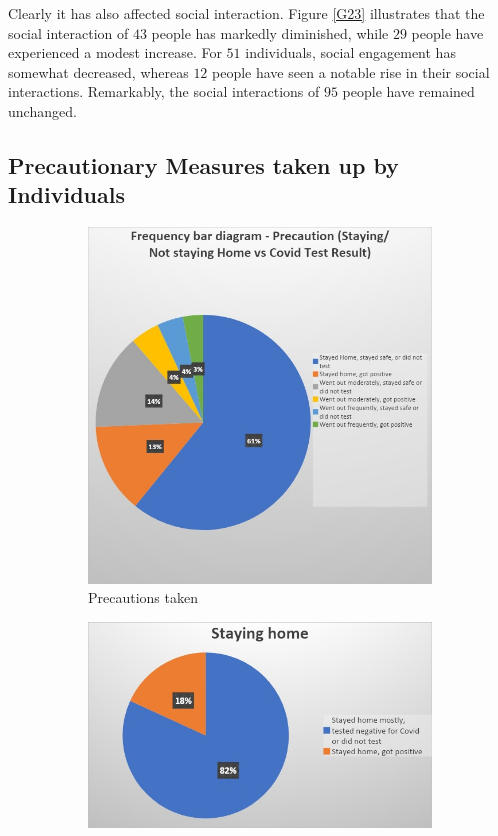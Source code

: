 Clearly it has also affected social interaction. Figure \ref{G23} illustrates that the social interaction of $43$ people has markedly diminished, while $29$ people have experienced a modest increase. For $51$ individuals, social engagement has somewhat decreased, whereas $12$ people have seen a notable rise in their social interactions. Remarkably, the social interactions of $95$ people have remained unchanged.


\newpage


\subsection{Precautionary Measures taken up by Individuals}

\begin{figure}[h!]
    \centering
    \begin{subfigure}{0.45\linewidth}
        \includegraphics[width=\linewidth]{IMAGES/Image 29.jpeg}
        \caption{Precautions taken}
        \label{G29}
    \end{subfigure}
    \hfill
    \begin{subfigure}{0.45\linewidth}
        \includegraphics[width=\linewidth]{IMAGES/Image 30.jpeg}

\end{subfigure}
\end{figure}
